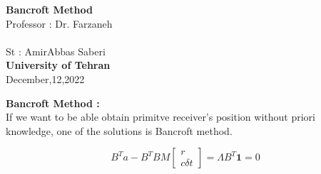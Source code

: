 \documentclass[12pt]{article}
\begin{document}
\begin{center}
\textbf{Bancroft Method} \\[1in]
Professor : Dr. Farzaneh\\~\\
St : AmirAbbas Saberi
\\[4in]
\textbf{University of Tehran}\\
December,12,2022
\end{center}
	\thispagestyle{firstpage}
\newpage
\textbf{Bancroft Method : }\\
If we want to be able obtain primitve receiver's position without priori knowledge, one of the solutions is Bancroft method.


\begin{equation}
  B^{T}a-B^{T}BM\begin{bmatrix}
     r\\
     c\delta t
    
\end{bmatrix} = \Lambda B^{T} \textbf{1} = 0
\end{equation}\\
\end{document}
